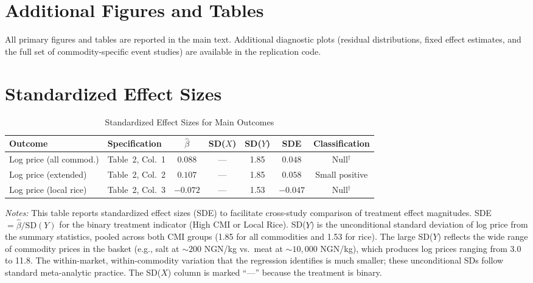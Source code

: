 \documentclass[12pt]{article}
\begin{document}
\section{Additional Figures and Tables}
\label{app:additional}

All primary figures and tables are reported in the main text. Additional diagnostic plots (residual distributions, fixed effect estimates, and the full set of commodity-specific event studies) are available in the replication code.


\section{Standardized Effect Sizes}
\label{sec:sde}

\begin{table}[H]
\centering
\caption{Standardized Effect Sizes for Main Outcomes}
\label{tab:sde}
\begin{adjustbox}{max width=\textwidth}
\begin{tabular}{llccccc}
\toprule
Outcome & Specification & $\hat{\beta}$ & SD($X$) & SD($Y$) & SDE & Classification \\
\midrule
Log price (all commod.) & Table~2, Col.\ 1 & $0.088$ & --- & 1.85 & $0.048$ & Null$^\dagger$ \\
Log price (extended) & Table~2, Col.\ 2 & $0.107$ & --- & 1.85 & $0.058$ & Small positive \\
Log price (local rice) & Table~2, Col.\ 3 & $-0.072$ & --- & 1.53 & $-0.047$ & Null$^\dagger$ \\
\bottomrule
\end{tabular}
\end{adjustbox}
\par\vspace{0.3em}
{\footnotesize \emph{Notes:} This table reports standardized effect sizes (SDE)
to facilitate cross-study comparison of treatment effect magnitudes.
SDE $= \hat{\beta} / \text{SD}(Y)$ for the binary treatment indicator (High CMI or Local Rice).
SD($Y$) is the unconditional standard deviation of log price from the summary statistics,
pooled across both CMI groups (1.85 for all commodities and 1.53 for rice).
The large SD($Y$) reflects the wide range of commodity prices in the basket (e.g., salt at ${\sim}200$ NGN/kg vs.\ meat at ${\sim}10{,}000$ NGN/kg), which produces log prices ranging from 3.0 to 11.8. The within-market, within-commodity variation that the regression identifies is much smaller; these unconditional SDs follow standard meta-analytic practice.
The SD($X$) column is marked ``---'' because the treatment is binary.

}
\end{table}
\end{document}

